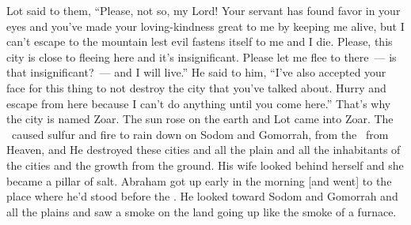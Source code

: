\begin{inparaenum}
   Lot said to them, ``Please, not so, my Lord!%
   Your servant has found favor in your eyes and you've made your loving-kindness great to me by keeping me alive, but I can't escape to the mountain lest evil fastens itself to me and I die.%
   Please, this city is close to fleeing here and it's insignificant. Please let me flee to there~--- is that insignificant?~--- and I will live.''%
   He said to him, ``I've also accepted your face for this thing to not destroy the city that you've talked about.%
   Hurry and escape from here because I can't do anything until you come here.'' That's why the city is named Zoar.%
   The sun rose on the earth and Lot came into Zoar.%
   The \lord\ caused sulfur and fire to rain down on Sodom and Gomorrah, from the \lord\ from Heaven,%
   and He destroyed these cities and all the plain and all the inhabitants of the cities and the growth from the ground.%
   His wife looked behind herself and she became a pillar of salt.%
   Abraham got up early in the morning [and went] to the place where he'd stood before the \lord.%
   He looked toward Sodom and Gomorrah and all the plains and saw a smoke on the land going up like the smoke of a furnace.%
  

\end{inparaenum}
